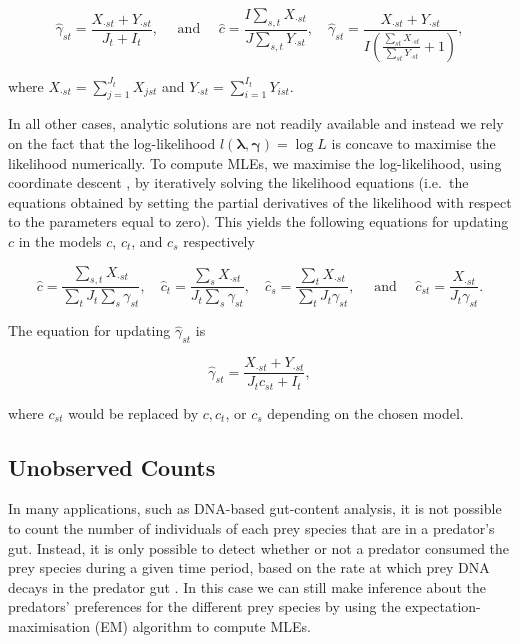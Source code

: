 \documentclass[smallextended]{svjour3}
\begin{document}
\begin{equation*}
  \hat{\gamma}_{st} = \frac{X_{\cdot st} + Y_{\cdot st}}{J_t + I_t}, \quad \text{ and } \quad \hat{c} = \frac{I \sum_{s,t} X_{\cdot st}}{J \sum_{s,t} Y_{\cdot st}}, \quad \hat{\gamma}_{st} = \frac{X_{\cdot st} + Y_{\cdot st}}{I \left( \frac{\sum_{st} X_{\cdot st}}{\sum_{st} Y_{\cdot st}} + 1 \right)},
\end{equation*}

\noindent where $X_{\cdot st} = \sum_{j=1}^{J_t}X_{jst}$ and $Y_{\cdot st} = \sum_{i=1}^{I_t} Y_{ist}$.

In all other cases, analytic solutions are not readily available and instead we rely on the fact that the log-likelihood $l(\boldsymbol{\lambda}, \boldsymbol{\gamma}) = \log{L}$ is concave to maximise the likelihood numerically.  To compute MLEs, we maximise the log-likelihood, using coordinate descent \citep{Luo:1992}, by iteratively solving the likelihood equations (i.e.\, the equations obtained by setting the partial derivatives of the likelihood with respect to the parameters equal to zero).  This yields the following equations for updating $c$ in the models $c$, $c_t$, and $c_s$ respectively

\begin{equation*}
  \hat{c} = \frac{\sum_{s,t} X_{\cdot st}}{\sum_t J_t \sum_s \gamma_{st}}, \quad \hat{c}_t =  \frac{\sum_s X_{\cdot st}}{J_t \sum_s \gamma_{st}}, \quad \hat{c}_s = \frac{\sum_{t}X_{\cdot st}}{\sum_t J_t \gamma_{st}}, \quad \text{ and } \quad \hat{c}_{st} = \frac{X_{\cdot st}}{J_t \gamma_{st}}.
\end{equation*}

\noindent The equation for updating $\hat \gamma_{st}$ is

\[ \hat{\gamma}_{st} = \frac{X_{\cdot st} + Y_{\cdot st}}{J_t c_{st} + I_t}, \]

\noindent where $c_{st}$ would be replaced by $c, c_t$, or $c_s$ depending on the chosen model.

\subsection{Unobserved Counts}
\label{sec:noncount}

In many applications, such as DNA-based gut-content analysis, it is not possible to count the number of individuals of each prey species that are in a predator's gut.  Instead, it is only possible to detect whether or not a predator consumed the prey species during a given time period, based on the rate at which prey DNA decays in the predator gut \citep{Greenstone:2013}.  In this case we can still make inference about the predators' preferences for the different prey species by using the expectation-maximisation (EM) algorithm to compute MLEs.
\end{document}
